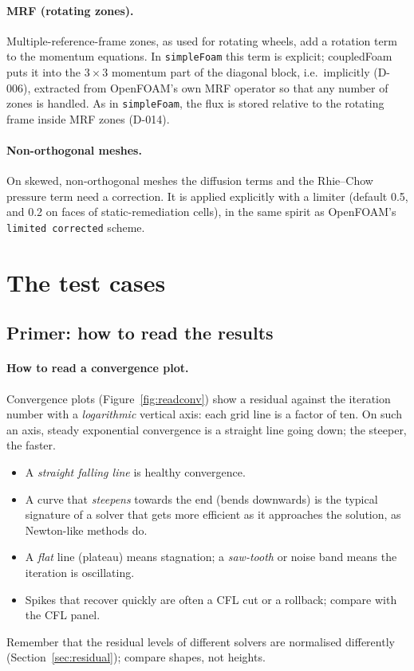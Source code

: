 \documentclass[11pt,a4paper]{article}
\newcommand{\code}[1]{\texttt{#1}}
\begin{document}
\paragraph{MRF (rotating zones).} Multiple-reference-frame zones, as used
for rotating wheels, add a rotation term to the momentum equations. In
\code{simpleFoam} this term is explicit; coupledFoam puts it into the
$3\times3$ momentum part of the diagonal block, i.e.\ implicitly (D-006),
extracted from OpenFOAM's own MRF operator so that any number of zones is
handled. As in \code{simpleFoam}, the flux is stored relative to the
rotating frame inside MRF zones (D-014).

\paragraph{Non-orthogonal meshes.} On skewed, non-orthogonal meshes the
diffusion terms and the Rhie--Chow pressure term need a correction. It is
applied explicitly with a limiter (default 0.5, and 0.2 on faces of
static-remediation cells), in the same spirit as OpenFOAM's
\code{limited corrected} scheme.

\section{The test cases}\label{sec:tests}

\subsection{Primer: how to read the results}\label{sec:primer}

\paragraph{How to read a convergence plot.}
Convergence plots (Figure~\ref{fig:readconv}) show a residual against the
iteration number with a \emph{logarithmic} vertical axis: each grid line is
a factor of ten. On such an axis, steady exponential convergence is a
straight line going down; the steeper, the faster.
\begin{itemize}
\item A \emph{straight falling line} is healthy convergence.
\item A curve that \emph{steepens} towards the end (bends downwards) is the
  typical signature of a solver that gets more efficient as it approaches
  the solution, as Newton-like methods do.
\item A \emph{flat} line (plateau) means stagnation; a \emph{saw-tooth} or
  noise band means the iteration is oscillating.
\item Spikes that recover quickly are often a CFL cut or a rollback;
  compare with the CFL panel.
\end{itemize}
Remember that the residual levels of different solvers are normalised
differently (Section~\ref{sec:residual}); compare shapes, not heights.
\end{document}
